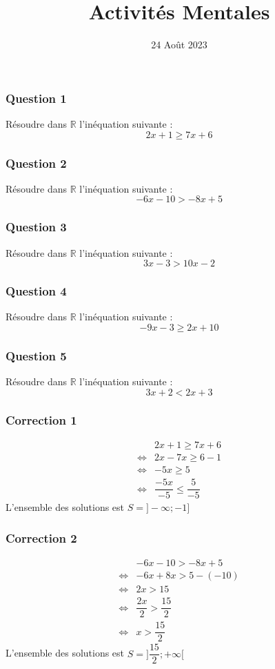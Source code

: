 \documentclass[15pt, mathserif]{beamer}
\title{Activités Mentales}
\date{24 Août 2023}
\newcommand{\R}{\mathbb{R}}			%
\begin{document}
\begin{frame}
    \titlepage
\end{frame}

\begin{frame} 
	\frametitle{Question 1}
Résoudre dans $\R$ l'inéquation suivante : 
 \[2x+1\geqslant  7x+6\] 
 \end{frame}


\begin{frame} 
	\frametitle{Question 2}
Résoudre dans $\R$ l'inéquation suivante : 
 \[-6x-10> -8x+5\] 
 \end{frame}


\begin{frame} 
	\frametitle{Question 3}
Résoudre dans $\R$ l'inéquation suivante : 
 \[3x-3> 10x-2\] 
 \end{frame}


\begin{frame} 
	\frametitle{Question 4}
Résoudre dans $\R$ l'inéquation suivante : 
 \[-9x-3\geqslant  2x+10\] 
 \end{frame}


\begin{frame} 
	\frametitle{Question 5}
Résoudre dans $\R$ l'inéquation suivante : 
 \[3x+2< 2x+3\] 
 \end{frame}


\begin{frame}
\vspace{-10mm}
	\frametitle{Correction 1}
\begin{align*} 
 & 2x+1\geqslant  7x+6\\ 
 \Leftrightarrow & 2x-7x \geqslant  6-1\\ 
 \Leftrightarrow & -5x \geqslant  5\\ 
 \Leftrightarrow &\dfrac{-5x}{-5} \leqslant \dfrac{5}{-5} 
 \end{align*} 
 L'ensemble des solutions est $S=]-\infty;-1]$\end{frame}


\begin{frame}
\vspace{-10mm}
	\frametitle{Correction 2}
\begin{align*} 
 & -6x-10> -8x+5\\ 
 \Leftrightarrow & -6x+8x > 5-\left(-10\right)\\ 
 \Leftrightarrow & 2x > 15\\ 
 \Leftrightarrow &\dfrac{2x}{2}> \dfrac{15}{2} \\ 
 \Leftrightarrow & x > \dfrac{15}{2} 
 \end{align*} 
 L'ensemble des solutions est $S=]\dfrac{15}{2};+\infty[$\end{frame}
\end{document}
